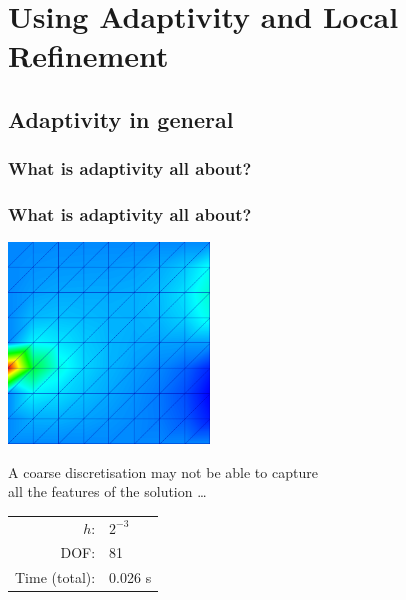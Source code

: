 \section{Using Adaptivity and Local Refinement}

\subsection{Adaptivity in general}

\subsubsection*{What is adaptivity all about?}

\begin{frame}
  \frametitle<presentation>{What is adaptivity all about?}
  \begin{center}
    \includegraphics[width=0.4\textwidth]{EPS/adaptivity/low_resolution}

    A coarse discretisation may not be able to capture \\ all the features of the solution \ldots

    \begin{tabular}{rl}
      $h$:          & $2^{-3}$ \\
      DOF:          & 81       \\
      Time (total): & 0.026 s
    \end{tabular}
  \end{center}
\end{frame}

